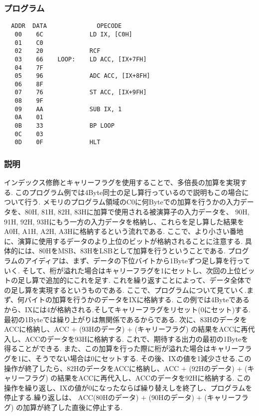 \documentclass[titlepage]{jsarticle}
\theoremstyle{definition}
\begin{document}
\subsubsection{プログラム}

\begin{lstlisting}
  ADDR  DATA              OPECODE
   00    6C             LD IX, [C0H]
   01    C0
   02    20             RCF
   03    66    LOOP:    LD ACC, [IX+7FH]
   04    7F
   05    96             ADC ACC, [IX+8FH]
   06    8F
   07    76             ST ACC, [IX+9FH]
   08    9F
   09    AA             SUB IX, 1
   0A    01
   0B    33             BP LOOP
   0C    03
   0D    0F             HLT
\end{lstlisting}

\subsubsection{説明}
インデックス修飾とキャリーフラグを使用することで、多倍長の加算を実現する.
このプログラム例では4Byte同士の足し算行っているので説明もこの場合について行う.
メモリのプログラム領域のC0に何Byteでの加算を行うかの入力データを、80H, 81H, 82H, 83Hに加算で使用される被演算子の入力データを、
90H, 91H, 92H, 93Hにもう一方の入力データを格納し、これらを足し算した結果をA0H, A1H, A2H, A3Hに格納するという流れである.
ここで、より小さい番地に、演算に使用するデータのより上位のビットが格納されることに注意する.
具体的には、80HをMSB、83HをLSBとして加算を行うということである.
プログラムのアイディアは、まず、データの下位バイトから1Byteずつ足し算を行っていく.
そして、桁が溢れた場合はキャリーフラグを1にセットし、次回の上位ビットの足し算で追加的にこれを足す.
これを繰り返すことによって、データ全体での足し算を実現するというものである.
ここで、プログラムについて見ていく.まず、何バイトの加算を行うかのデータをIXに格納する.
この例では4Byteであるから、IXには4が格納される.そしてキャリーフラグをリセット(0にセット)する.最初の1Byteでは繰り上がりは無関係であるからである.
次に、83HのデータをACCに格納し、ACC $+$ (93Hのデータ) $+$ (キャリーフラグ) の結果をACCに再代入し、ACCのデータを93Hに格納する.
これで、期待する出力の最初の1Byteを得ることができる.
また、この加算を行った際に桁が溢れた場合はキャリーフラグを1に、そうでない場合は0にセットする.
その後、IXの値を1減少させる.この操作が終了したら、82HのデータをACCに格納し、ACC $+$ (92Hのデータ) $+$ (キャリーフラグ) の結果をACCに再代入し、ACCのデータを92Hに格納する.
この操作を繰り返し、IXの値が0になったならば繰り替えしを終了し、プログラムを停止する.繰り返しは、
ACC(80Hのデータ) $+$ (90Hのデータ) $+$ (キャリーフラグ) の加算が終了した直後に停止する.
\end{document}
